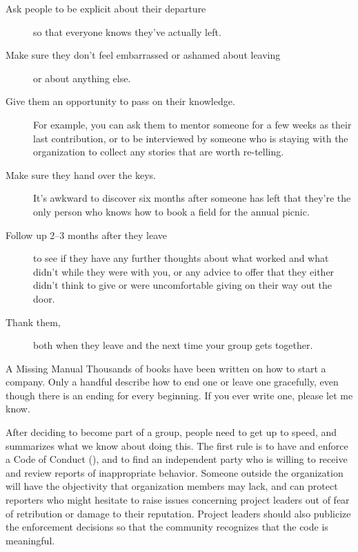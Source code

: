 \begin{description}

\item[Ask people to be explicit about their departure]
  so that everyone knows they've actually left.

\item[Make sure they don't feel embarrassed or ashamed about leaving]
  or about anything else.

\item[Give them an opportunity to pass on their knowledge.]
  For example,
  you can ask them to mentor someone for a few weeks as their last contribution,
  or to be interviewed by someone who is staying with the organization
  to collect any stories that are worth re-telling.

\item[Make sure they hand over the keys.]
  It's awkward to discover six months after someone has left
  that they're the only person who knows how to book a field for the annual picnic.

\item[Follow up 2--3 months after they leave]
  to see if they have any further thoughts about what worked and what didn't while they were with you,
  or any advice to offer that they either didn't think to give
  or were uncomfortable giving on their way out the door.

\item[Thank them,]
  both when they leave and the next time your group gets together.

\end{description}

\begin{aside}{A Missing Manual}
  Thousands of books have been written on how to start a company.
  Only a handful describe how to end one or leave one gracefully,
  even though there is an ending for every beginning.
  If you ever write one,
  please let me know.
\end{aside}


After deciding to become part of a group,
people need to get up to speed,
and \cite{Shol2019} summarizes what we know about doing this.
The first rule is to have and enforce a Code of Conduct (),
and to find an independent party who is willing to receive and review reports of inappropriate behavior.
Someone outside the organization will have the objectivity that organization members may lack,
and can protect reporters who might hesitate to raise issues concerning project leaders
out of fear of retribution or damage to their reputation.
Project leaders should also publicize the enforcement decisions
so that the community recognizes that the code is meaningful.


